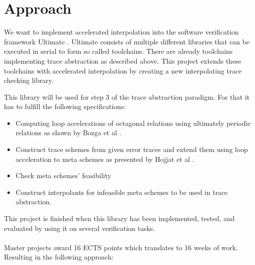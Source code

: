 \documentclass{article}
\begin{document}
\section{Approach}
We want to implement accelerated interpolation into the software verification framework Ultimate \cite{Zitat02}. Ultimate consists of multiple different libraries that can be executed in serial to form so called toolchains. There are already toolchains implementing trace abstraction as described above. This project extends these toolchains with accelerated interpolation by creating a new interpolating trace checking library. \par 
This library will be used for step 3 of the trace abstraction paradigm. For that it has to fulfill the following specifications: 
\begin{itemize}
	\item Computing loop accelerations of octagonal relations using ultimately periodic relations as shown by Bozga et al \cite{10.1007/978-3-642-14295-6_23}. 
	\item Construct trace schemes from given error traces and extend them using loop acceleration to meta schemes as presented by Hojjat et al \cite{10.1007/978-3-642-33386-6_16}.
	\item Check meta schemes' feasibility
	\item Construct interpolants for infeasible meta schemes to be used in trace abstraction.
\end{itemize}
This project is finished when this library has been implemented, tested, and evaluated by using it on several verification tasks. \\ \\
Master projects award 16 ECTS points which translates to 16 weeks of work. Resulting in the following approach:
\end{document}
